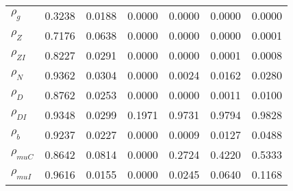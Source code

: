 \begin{center}
\begin{longtable}{lcccccc}
$ {\rho_g}             $	 & 	          0.3238	 & 	          0.0188	 & 	          0.0000	 & 	          0.0000	 & 	          0.0000	 & 	          0.0000 \\ 
$ {\rho_Z}             $	 & 	          0.7176	 & 	          0.0638	 & 	          0.0000	 & 	          0.0000	 & 	          0.0000	 & 	          0.0001 \\ 
$ {\rho_{ZI}}          $	 & 	          0.8227	 & 	          0.0291	 & 	          0.0000	 & 	          0.0000	 & 	          0.0001	 & 	          0.0008 \\ 
$ {\rho_N}             $	 & 	          0.9362	 & 	          0.0304	 & 	          0.0000	 & 	          0.0024	 & 	          0.0162	 & 	          0.0280 \\ 
$ {\rho_D}             $	 & 	          0.8762	 & 	          0.0253	 & 	          0.0000	 & 	          0.0000	 & 	          0.0011	 & 	          0.0100 \\ 
$ {\rho_{DI}}          $	 & 	          0.9348	 & 	          0.0299	 & 	          0.1971	 & 	          0.9731	 & 	          0.9794	 & 	          0.9828 \\ 
$ {\rho_b}             $	 & 	          0.9237	 & 	          0.0227	 & 	          0.0000	 & 	          0.0009	 & 	          0.0127	 & 	          0.0488 \\ 
$ {\rho_{muC}}         $	 & 	          0.8642	 & 	          0.0814	 & 	          0.0000	 & 	          0.2724	 & 	          0.4220	 & 	          0.5333 \\ 
$ {\rho_{muI}}         $	 & 	          0.9616	 & 	          0.0155	 & 	          0.0000	 & 	          0.0245	 & 	          0.0640	 & 	          0.1168 \\ 
\end{longtable}
 \end{center}
